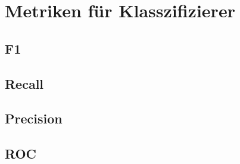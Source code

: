 \section{Metriken für Klasszifizierer}

\subsection{F1}

\subsection{Recall}

\subsection{Precision}

\subsection{ROC}